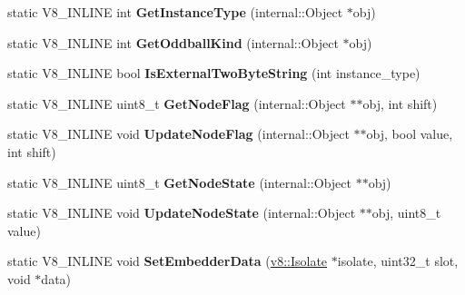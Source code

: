 \begin{DoxyCompactItemize}
\item 
\hypertarget{classv8_1_1internal_1_1Internals_a7262da07b4ed930b2ccf2d83ba7b4b56}{static V8\-\_\-\-I\-N\-L\-I\-N\-E int {\bfseries Get\-Instance\-Type} (internal\-::\-Object $\ast$obj)}\label{classv8_1_1internal_1_1Internals_a7262da07b4ed930b2ccf2d83ba7b4b56}

\item 
\hypertarget{classv8_1_1internal_1_1Internals_a2891c298313f75dc8fe1c7ee6877412e}{static V8\-\_\-\-I\-N\-L\-I\-N\-E int {\bfseries Get\-Oddball\-Kind} (internal\-::\-Object $\ast$obj)}\label{classv8_1_1internal_1_1Internals_a2891c298313f75dc8fe1c7ee6877412e}

\item 
\hypertarget{classv8_1_1internal_1_1Internals_afbf930e9dfde745b54e1e7e03b5b96c8}{static V8\-\_\-\-I\-N\-L\-I\-N\-E bool {\bfseries Is\-External\-Two\-Byte\-String} (int instance\-\_\-type)}\label{classv8_1_1internal_1_1Internals_afbf930e9dfde745b54e1e7e03b5b96c8}

\item 
\hypertarget{classv8_1_1internal_1_1Internals_aa7df51a3da3e021e2bd4426461e6d1fb}{static V8\-\_\-\-I\-N\-L\-I\-N\-E uint8\-\_\-t {\bfseries Get\-Node\-Flag} (internal\-::\-Object $\ast$$\ast$obj, int shift)}\label{classv8_1_1internal_1_1Internals_aa7df51a3da3e021e2bd4426461e6d1fb}

\item 
\hypertarget{classv8_1_1internal_1_1Internals_a868ffed15d660ac6959597e45a353d6e}{static V8\-\_\-\-I\-N\-L\-I\-N\-E void {\bfseries Update\-Node\-Flag} (internal\-::\-Object $\ast$$\ast$obj, bool value, int shift)}\label{classv8_1_1internal_1_1Internals_a868ffed15d660ac6959597e45a353d6e}

\item 
\hypertarget{classv8_1_1internal_1_1Internals_a76c388eb1d813144512b0af2d1c5ac7b}{static V8\-\_\-\-I\-N\-L\-I\-N\-E uint8\-\_\-t {\bfseries Get\-Node\-State} (internal\-::\-Object $\ast$$\ast$obj)}\label{classv8_1_1internal_1_1Internals_a76c388eb1d813144512b0af2d1c5ac7b}

\item 
\hypertarget{classv8_1_1internal_1_1Internals_a0f37a58646403a6a39f925006a98a0d0}{static V8\-\_\-\-I\-N\-L\-I\-N\-E void {\bfseries Update\-Node\-State} (internal\-::\-Object $\ast$$\ast$obj, uint8\-\_\-t value)}\label{classv8_1_1internal_1_1Internals_a0f37a58646403a6a39f925006a98a0d0}

\item 
\hypertarget{classv8_1_1internal_1_1Internals_abe73d79832edf012f30a94ccc4b293d2}{static V8\-\_\-\-I\-N\-L\-I\-N\-E void {\bfseries Set\-Embedder\-Data} (\hyperlink{classv8_1_1Isolate}{v8\-::\-Isolate} $\ast$isolate, uint32\-\_\-t slot, void $\ast$data)}\label{classv8_1_1internal_1_1Internals_abe73d79832edf012f30a94ccc4b293d2}


\end{DoxyCompactItemize}
